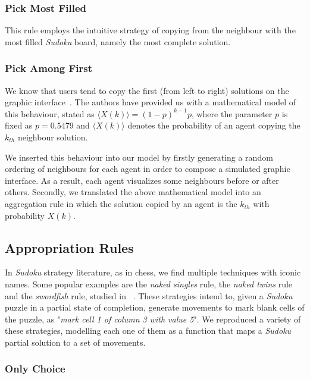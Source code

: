 \documentclass{article}
\begin{document}
\subsubsection{Pick Most Filled}

This rule employs the intuitive strategy of copying from the neighbour with the most filled {\em Sudoku} board, namely the most complete solution.

\subsubsection{Pick Among First}

We know that users tend to copy the first (from left to right) solutions on the graphic interface~\cite{farenzena:collabem}. The authors have provided us with a mathematical model of this behaviour, stated as $\langle X(k)\rangle = (1-p)^{k-1}p$, where the parameter $p$ is fixed as $p = 0.5479$ and $\langle X(k)\rangle$ denotes the probability of an agent copying the $k_{th}$ neighbour solution.

We inserted this behaviour into our model by firstly generating a random ordering of neighbours for each agent in order to compose a simulated graphic interface. As a result, each agent visualizes some neighbours before or after others. Secondly, we translated the above mathematical model into an aggregation rule in which the solution copied by an agent is the $k_{th}$ with probability $X(k)$.

\subsection{Appropriation Rules}

In {\em Sudoku} strategy literature, as in chess, we find multiple techniques with iconic names. Some popular examples are the {\em naked singles} rule, the {\em naked twins} rule and the {\em swordfish} rule, studied in ~\cite{davis:mathsudoku}. These strategies intend to, given a {\em Sudoku} puzzle in a partial state of completion, generate movements to mark blank cells of the puzzle, as "{\em mark cell 1 of column 3 with value 5}". We reproduced a variety of these strategies, modelling each one of them as a function that maps a {\em Sudoku} partial solution to a set of movements.

\subsubsection{Only Choice}
\end{document}
